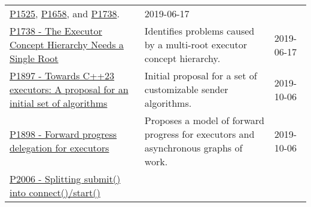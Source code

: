\documentclass[a4paper,12pt,notitlepage,twoside,openright]{article}
\begin{document}
\begin{longtable}[]{@{}lll@{}}
\begin{minipage}[t]{0.54\columnwidth}
\href{https://wg21.link/P1525}{P1525},
\href{https://wg21.link/P1658}{P1658}, and
\href{https://wg21.link/P1738}{P1738}.\strut
\end{minipage} & \begin{minipage}[t]{0.05\columnwidth}\raggedright
2019-06-17\strut
\end{minipage}\tabularnewline
\begin{minipage}[t]{0.32\columnwidth}\raggedright
\href{https://wg21.link/P1738}{P1738 - The Executor Concept Hierarchy
Needs a Single Root}\strut
\end{minipage} & \begin{minipage}[t]{0.54\columnwidth}\raggedright
Identifies problems caused by a multi-root executor concept
hierarchy.\strut
\end{minipage} & \begin{minipage}[t]{0.05\columnwidth}\raggedright
2019-06-17\strut
\end{minipage}\tabularnewline
\begin{minipage}[t]{0.32\columnwidth}\raggedright
\href{https://wg21.link/P1897}{P1897 - Towards C++23 executors: A
proposal for an initial set of algorithms}\strut
\end{minipage} & \begin{minipage}[t]{0.54\columnwidth}\raggedright
Initial proposal for a set of customizable sender algorithms.\strut
\end{minipage} & \begin{minipage}[t]{0.05\columnwidth}\raggedright
2019-10-06\strut
\end{minipage}\tabularnewline
\begin{minipage}[t]{0.32\columnwidth}\raggedright
\href{https://wg21.link/P1898}{P1898 - Forward progress delegation for
executors}\strut
\end{minipage} & \begin{minipage}[t]{0.54\columnwidth}\raggedright
Proposes a model of forward progress for executors and asynchronous
graphs of work.\strut
\end{minipage} & \begin{minipage}[t]{0.05\columnwidth}\raggedright
2019-10-06\strut
\end{minipage}\tabularnewline
\begin{minipage}[t]{0.32\columnwidth}\raggedright
\href{https://wg21.link/P2006}{P2006 - Splitting submit() into
connect()/start()}\strut
\end{minipage} & \begin{minipage}[t]{0.54\columnwidth}\raggedright

\end{minipage}
\end{longtable}
\end{document}
